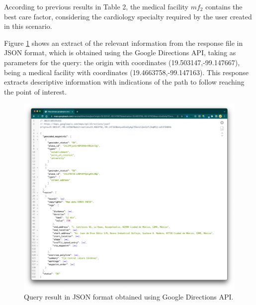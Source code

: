\documentclass[sustainability,article,submit,pdftex,moreauthors]{Definitions/mdpi}
\begin{document}

According to previous results in Table 2, the medical facility $mf_{2}$ contains the best care factor, considering the cardiology specialty required by the user created in this scenario.


Figure \ref{figure_query_one} shows an extract of the relevant information from the response file in JSON format, which is obtained using the Google Directions API, taking as parameters for the query: the origin with coordinates (19.503147,-99.147667), being a medical facility with coordinates (19.4663758,-99.147163). This response extracts descriptive information with indications of the path to follow reaching the point of interest.

\begin{figure}[H]
\includegraphics[width=10.5 cm]{result_directions_api.png}
\caption{Query result in JSON format obtained using Google Directions API. \\\label{figure_query_one}}
\end{figure}
\unskip
\end{document}
